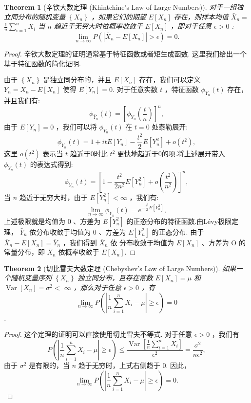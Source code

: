 \documentclass[UTF8,12pt]{ctexart}
\numberwithin{equation}{section}%
\newtheorem{thm}{Theorem}[section]
\begin{document}
 	
 	\begin{thm}[辛钦大数定理 (Khintchine's Law of Large Numbers)]
 		对于一组独立同分布的随机变量 $\left\{X_n\right\}$ ，如果它们的期望 $E\left[X_n\right]$ 存在，则样本均值 $\bar{X}_n=$ $\frac{1}{n} \sum_{i=1}^n X_i$ 当 $n$ 趋近于无穷大时依概率收敛于 $E\left[X_n\right]$ ，即对于任意 $\epsilon>0$ :
 		$$
 		\lim _{n \rightarrow \infty} P\left(\left|\bar{X}_n-E\left[X_n\right]\right|>\epsilon\right)=0.
 		$$
 	\end{thm}
 	\begin{proof}
 		辛钦大数定理的证明通常基于特征函数或者矩生成函数. 这里我们给出一个基于特征函数的简化证明.
 		
 		由于 $\left\{X_n\right\}$ 是独立同分布的，并且 $E\left[X_n\right]$ 存在，我们可以定义 $Y_n=X_n-E\left[X_n\right]$ 使得 $E\left[Y_n\right]=0$. 对于任意实数 $t$ ，特征函数 $\phi_{Y_n}(t)$ 存在，并且我们有:
 		$$
 		\phi_{\bar{Y}_n}(t)=\left[\phi_{Y_n}\left(\frac{t}{n}\right)\right]^n
 		,$$
 		由于 $E\left[Y_n\right]=0$ ，我们可以将 $\phi_{Y_n}(t)$ 在 $t=0$ 处泰勒展开:
 		$$
 		\phi_{Y_n}(t)=1+i t E\left[Y_n\right]-\frac{t^2}{2} E\left[Y_n^2\right]+o\left(t^2\right),
 		$$
 		这里 $o\left(t^2\right)$ 表示当 $t$ 趋近于0时比 $t^2$ 更快地趋近于0的项.将上述展开带入 $\phi_{Y_n}(t)$ 的表达式得到:
 		$$
 		\phi_{Y_n}(t)=\left[1-\frac{t^2}{2 n^2} E\left[Y_n^2\right]+o\left(\frac{t^2}{n^2}\right)\right]^n,
 		$$
 		当 $n$ 趋近于无穷大时，由于 $E\left[Y_n^2\right]<\infty$ ，我们有:
 		$$
 		\lim _{n \rightarrow \infty} \phi_{Y_n}(t)=e^{-\frac{t^2}{2} E\left[Y_n^2\right]},
 		$$
 		上述极限就是均值为 0 、方差为 $E\left[Y_n^2\right]$ 的正态分布的特征函数.由Lévy极限定理， $\bar{Y}_n$ 依分布收敛于均值为 0 、方差为 $E\left[Y_n^2\right]$ 的正态分布. 由于 $\bar{X}_n-E\left[X_n\right]=\bar{Y}_n$ ，我们得到 $\bar{X}_n$ 依 分布收敛于均值为 $E\left[X_n\right]$ 、方差为 $\mathrm{O}$ 的常量分布，即 $\bar{X}_n$ 依概率收敛于 $E\left[X_n\right]$.
 	\end{proof}
 
 
 	\begin{thm}[切比雪夫大数定理 (Chebyshev's Law of Large Numbers)]
 		如果一个随机变量序列 $\left\{X_n\right\}$ 独立同分布，且存在常数 $E\left[X_n\right]=\mu$ 和 $\operatorname{Var}\left[X_n\right]=\sigma^2<$ $\infty$ ，那么对于任意 $\epsilon>0$ ，有
 		$$
 		\lim _{n \rightarrow \infty} P\left(\left|\frac{1}{n} \sum_{i=1}^n X_i-\mu\right| \geq \epsilon\right)=0
 		$$.
 	\end{thm}
	\begin{proof}
		这个定理的证明可以直接使用切比雪夫不等式. 对于任意 $\epsilon>0$ ，我们有
		$$
		P\left(\left|\frac{1}{n} \sum_{i=1}^n X_i-\mu\right| \geq \epsilon\right) \leq \frac{\operatorname{Var}\left[\frac{1}{n} \sum_{i=1}^n X_i\right]}{\epsilon^2}=\frac{\sigma^2}{n \epsilon^2},
		$$
		由于 $\sigma^2$ 是有限的，当 $n$ 趋于无穷时，上式右侧趋于 0. 因此，
		$$
		\lim _{n \rightarrow \infty} P\left(\left|\frac{1}{n} \sum_{i=1}^n X_i-\mu\right| \geq \epsilon\right)=0.
		$$
	\end{proof}
	
\end{document}
